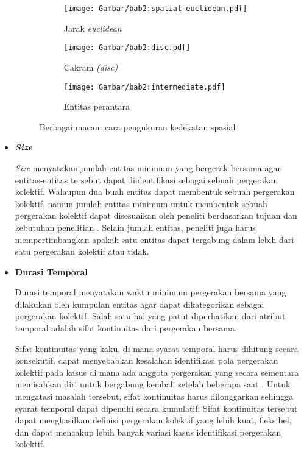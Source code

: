 \begin{itemize}
    \begin{figure}[h]
        \centering
        \begin{subfigure}[h]{0.25\textwidth}
            \centering
            \texttt{[image: Gambar/bab2:spatial-euclidean.pdf]}
            \caption{Jarak \textit{euclidean}}
        \end{subfigure} \hspace{0.75cm}
        \begin{subfigure}[h]{0.25\textwidth}
            \centering
            \texttt{[image: Gambar/bab2:disc.pdf]}
            \caption{Cakram \textit{(disc)}}
        \end{subfigure} \hspace{0.75cm}
        \begin{subfigure}[h]{0.25\textwidth}
            \centering
            \texttt{[image: Gambar/bab2:intermediate.pdf]}
            \caption{Entitas perantara}
        \end{subfigure}
        \caption[Pengukuran kedekatan spasial]{Berbagai macam cara pengukuran kedekatan spasial}
        \label{bab2:spasial}
    \end{figure}
    \item \textbf{\textit{Size}} \iffalse \lionov{kayaknya ini jangan pake ``ukuran'', nanti sama dengan measure, pake {\it size} ato langung aja jumlah minimumentitas } \fi
    
    \textit{Size} menyatakan jumlah entitas minimum yang bergerak bersama agar entitas-entitas tersebut dapat diidentifikasi sebagai sebuah pergerakan kolektif. Walaupun dua buah entitas dapat membentuk sebuah pergerakan kolektif, namun jumlah entitas minimum untuk membentuk sebuah pergerakan kolektif dapat disesuaikan oleh peneliti berdasarkan tujuan dan kebutuhan penelitian \cite{wiratma:trajectory}. Selain jumlah entitas, peneliti juga harus mempertimbangkan apakah satu entitas dapat tergabung dalam lebih dari satu pergerakan kolektif atau tidak.
    
    \newpage
    
    \item \textbf{Durasi Temporal}
    
    Durasi temporal menyatakan waktu minimum pergerakan bersama yang dilakukan oleh kumpulan entitas agar dapat dikategorikan sebagai pergerakan kolektif. Salah satu hal yang patut diperhatikan dari atribut temporal adalah sifat kontinuitas dari pergerakan bersama.
    
    Sifat kontinuitas yang kaku, di mana syarat temporal harus dihitung secara konsekutif, dapat menyebabkan kesalahan identifikasi pola pergerakan kolektif pada kasus di mana ada anggota pergerakan yang secara sementara memisahkan diri untuk bergabung kembali setelah beberapa saat \cite{wiratma:trajectory}. Untuk mengatasi masalah tersebut, sifat kontinuitas harus dilonggarkan sehingga syarat temporal dapat dipenuhi secara kumulatif. Sifat kontinuitas tersebut dapat menghasilkan definisi pergerakan kolektif yang lebih kuat, fleksibel, dan dapat mencakup lebih banyak variasi kasus identifikasi pergerakan kolektif.
\end{itemize}

